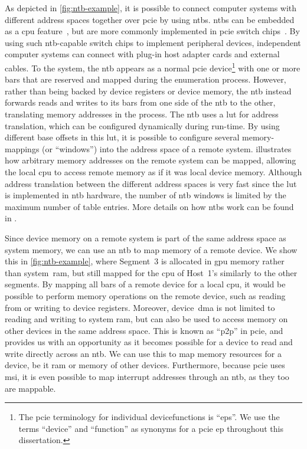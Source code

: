 As depicted in \cref{fig:ntb-example}, it is possible to connect computer systems with different address spaces together over \gls{pcie} by using \glspl{ntb}.
%
\Glspl{ntb} can be embedded as a \gls{cpu} feature~\cite{whitepaper:Sullivan2010,url:LinuxNTB-AMD}, but are more commonly implemented in \gls{pcie} switch chips~\cite{whitepaper:PLX,pex8733}.
%
By using such \gls{ntb}-capable switch chips to implement peripheral devices, independent computer systems can connect with plug-in host adapter cards and external cables.
%
To the system, the \gls{ntb} appears as a normal \gls{pcie} device\footnote{The \gls{pcie} terminology for individual \glspl{devicefunction} is ``\glspl{ep}''. We use the terms ``device'' and ``\gls{function}'' as synonyms for a \gls{pcie} \gls{ep} throughout this dissertation.} with one or more \glspl{bar} that are reserved and mapped during the enumeration process.
%
However, rather than being backed by device registers or device memory, the \gls{ntb} instead forwards reads and writes to its \glspl{bar} from one side of the \gls{ntb} to the other, translating memory addresses in the process.
%
The \gls{ntb} uses a \gls{lut} for address translation, which can be configured dynamically during run-time.
%
By using different base offsets in this \gls{lut}, it is possible to configure several memory-mappings (or ``windows'') into the address space of a remote system.
%
 illustrates how arbitrary memory addresses on the remote system can be mapped, allowing the local \gls{cpu} to access remote memory as if it was local device memory.
%
Although address translation between the different address spaces is very fast since the \gls{lut} is implemented in \gls{ntb} hardware, the number of \gls{ntb} windows is limited by the maximum number of table entries.
%
More details on how \glspl{ntb} work can be found in .



Since device memory on a remote system is part of the same address space as system memory, we can use an \gls{ntb} to map memory of a remote device.
%
We show this in \cref{fig:ntb-example}, where Segment~3 is allocated in \gls{gpu} memory rather than system~\gls{ram}, but still mapped for the \gls{cpu} of Host~1's similarly to the other \glspl{segment}.
%
By mapping all \glspl{bar} of a remote device for a local \gls{cpu}, it would be possible to perform memory operations on the remote device, such as reading from or writing to device registers.
%
Moreover, device~\gls{dma} is not limited to reading and writing to system \gls{ram}, but can also be used to access memory on other devices in the same address space.
%
This is known as ``\gls{p2p}'' in \gls{pcie}, and provides us with an opportunity as it becomes possible for a device to read and write directly across an \gls{ntb}.
%
We can use this to map memory resources for a device, be it \gls{ram} or memory of other devices. 
%
Furthermore, because \gls{pcie} uses \gls{msi}, it is even possible to map interrupt addresses through an \gls{ntb}, as they too are mappable.




